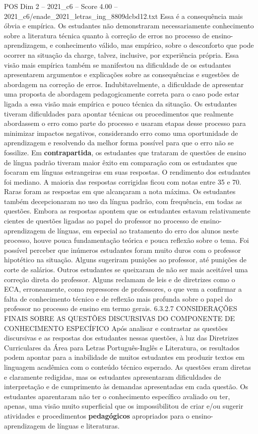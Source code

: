 \begin{textsample}{POS Dim 2 – 2021\_c6 – Score 4.00 – 2021\_c6/enade\_2021\_letras\_ing\_8809dcbd12.txt}
Essa é a consequência mais óbvia e empírica.
Os estudantes não demonstraram necessariamente conhecimento sobre a literatura técnica quanto à correção de erros no processo de ensino-aprendizagem, e conhecimento válido, mas empírico, sobre o desconforto que pode ocorrer na situação da charge, talvez, inclusive, por experiência própria.
Essa visão mais empírica também se manifestou na dificuldade de os estudantes apresentarem argumentos e explicações sobre as consequências e sugestões de abordagem na correção de erros.
Indubitavelmente, a dificuldade de apresentar uma proposta de abordagem pedagogicamente correta para o caso pode estar ligada a essa visão mais empírica e pouco técnica da situação.
Os estudantes tiveram dificuldades para apontar técnicas ou procedimentos que realmente abordassem o erro como parte do processo e usaram etapas desse processo para minimizar impactos negativos, considerando erro como uma oportunidade de aprendizagem e resolvendo da melhor forma possível para que o erro não se fossilize.
Em \textbf{contrapartida}, os estudantes que trataram de questões de ensino de língua padrão tiveram maior êxito em comparação com os estudantes que focaram em línguas estrangeiras em suas respostas.
O rendimento dos estudantes foi mediano.
A maioria das respostas corrigidas ficou com notas entre 35 e 70.
Raras foram as respostas em que alcançaram a nota máxima.
Os estudantes também decepcionaram no uso da língua padrão, com frequência, em todas as questões.
Embora as respostas apontem que os estudantes estavam relativamente cientes de questões ligadas ao papel do professor no processo de ensino-aprendizagem de línguas, em especial ao tratamento do erro dos alunos neste processo, houve pouca fundamentação teórica e pouca reflexão sobre o tema.
Foi possível perceber que inúmeros estudantes foram muito duros com o professor hipotético na situação.
Alguns sugeriram punições ao professor, até punições de corte de salários.
Outros estudantes se queixaram de não ser mais aceitável uma correção direta do professor.
Alguns reclamam de leis e de diretrizes como o ECA, erroneamente, como repressores de professores, o que vem a confirmar a falta de conhecimento técnico e de reflexão mais profunda sobre o papel do professor no processo de ensino em termo gerais. 6.3.2.7 CONSIDERAÇÕES FINAIS SOBRE AS QUESTÕES DISCURSIVAS DO COMPONENTE DE CONHECIMENTO ESPECÍFICO Após analisar e contrastar as questões discursivas e as respostas dos estudantes nessas questões, à luz das Diretrizes Curriculares da Área para Letras Português-Inglês e Literatura, os resultados podem apontar para a inabilidade de muitos estudantes em produzir textos em linguagem acadêmica com o conteúdo técnico esperado.
As questões eram diretas e claramente redigidas, mas os estudantes apresentaram dificuldades de interpretação e de cumprimento às demandas apresentadas em cada questão.
Os estudantes aparentaram não ter o conhecimento específico avaliado ou ter, apenas, uma visão muito superficial que os impossibilitou de criar e/ou sugerir atividades e procedimentos \textbf{pedagógicos} apropriados para o ensino-aprendizagem de línguas e literaturas.

\end{textsample}
